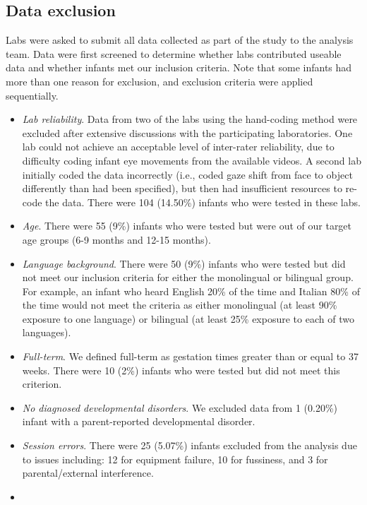 \documentclass[,man,floatsintext]{apa6}
\begin{document}
\hypertarget{data-exclusion}{%
\subsection{Data exclusion}\label{data-exclusion}}

Labs were asked to submit all data collected as part of the study to the analysis team. Data were first screened to determine whether labs contributed useable data and whether infants met our inclusion criteria. Note that some infants had more than one reason for exclusion, and exclusion criteria were applied sequentially.

\begin{itemize}
\item
  \emph{Lab reliability}. Data from two of the labs using the hand-coding method were excluded after extensive discussions with the participating laboratories. One lab could not achieve an acceptable level of inter-rater reliability, due to difficulty coding infant eye movements from the available videos. A second lab initially coded the data incorrectly (i.e., coded gaze shift from face to object differently than had been specified), but then had insufficient resources to re-code the data. There were 104 (14.50\%) infants who were tested in these labs.
\item
  \emph{Age}. There were 55 (9\%) infants who were tested but were out of our target age groups (6-9 months and 12-15 months).
\item
  \emph{Language background}. There were 50 (9\%) infants who were tested but did not meet our inclusion criteria for either the monolingual or bilingual group. For example, an infant who heard English 20\% of the time and Italian 80\% of the time would not meet the criteria as either monolingual (at least 90\% exposure to one language) or bilingual (at least 25\% exposure to each of two languages).
\item
  \emph{Full-term}. We defined full-term as gestation times greater than or equal to 37 weeks. There were 10 (2\%) infants who were tested but did not meet this criterion.
\item
  \emph{No diagnosed developmental disorders}. We excluded data from 1 (0.20\%) infant with a parent-reported developmental disorder.
\item
  \emph{Session errors}. There were 25 (5.07\%) infants excluded from the analysis due to issues including: 12 for equipment failure, 10 for fussiness, and 3 for parental/external interference.
\item

\end{itemize}
\end{document}
